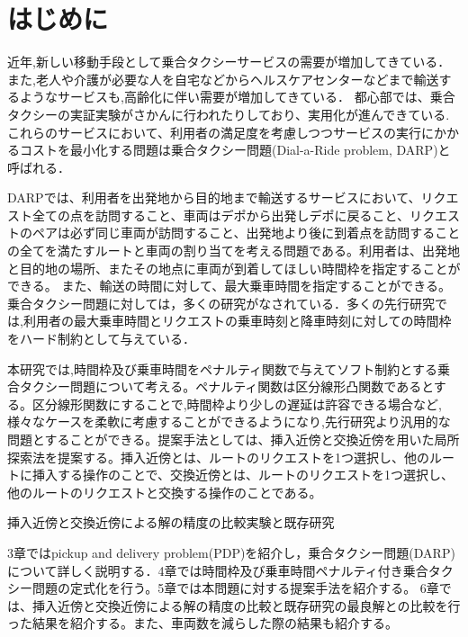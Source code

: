 \chapter{はじめに}
近年,新しい移動手段として乗合タクシーサービスの需要が増加してきている．また,老人や介護が必要な人を自宅などからヘルスケアセンターなどまで輸送するようなサービスも,高齢化に伴い需要が増加してきている．
都心部では、乗合タクシーの実証実験がさかんに行われたりしており、実用化が進んできている.
これらのサービスにおいて、利用者の満足度を考慮しつつサービスの実行にかかるコストを最小化する問題は乗合タクシー問題(Dial-a-Ride problem, DARP)と呼ばれる．

DARPでは、利用者を出発地から目的地まで輸送するサービスにおいて、リクエスト全ての点を訪問すること、車両はデポから出発しデポに戻ること、リクエストのペアは必ず同じ車両が訪問すること、出発地より後に到着点を訪問することの全てを満たすルートと車両の割り当てを考える問題である。利用者は、出発地と目的地の場所、またその地点に車両が到着してほしい時間枠を指定することができる。
また、輸送の時間に対して、最大乗車時間を指定することができる。
乗合タクシー問題に対しては，多くの研究がなされている．多くの先行研究では,利用者の最大乗車時間とリクエストの乗車時刻と降車時刻に対しての時間枠をハード制約として与えている．

本研究では,時間枠及び乗車時間をペナルティ関数で与えてソフト制約とする乗合タクシー問題について考える。ペナルティ関数は区分線形凸関数であるとする。区分線形関数にすることで,時間枠より少しの遅延は許容できる場合など,様々なケースを柔軟に考慮することができるようになり,先行研究より汎用的な問題とすることができる。提案手法としては、挿入近傍と交換近傍を用いた局所探索法を提案する。挿入近傍とは、ルートのリクエストを1つ選択し、他のルートに挿入する操作のことで、交換近傍とは、ルートのリクエストを1つ選択し、他のルートのリクエストと交換する操作のことである。

挿入近傍と交換近傍による解の精度の比較実験と既存研究

3章ではpickup and delivery problem(PDP)を紹介し，乗合タクシー問題(DARP)について詳しく説明する．4章では時間枠及び乗車時間ペナルティ付き乗合タクシー問題の定式化を行う。5章では本問題に対する提案手法を紹介する。
6章では、挿入近傍と交換近傍による解の精度の比較と既存研究の最良解との比較を行った結果を紹介する。また、車両数を減らした際の結果も紹介する。
